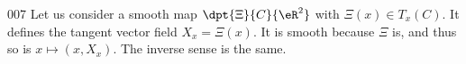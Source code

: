 \begin{corrige}{007}
Let us consider a smooth map $\dpt{ \Xi }{ C }{ \eR^2 }$ with $\Xi(x)\in T_x(C)$. It defines the tangent vector field $X_x=\Xi(x)$. It is smooth because $\Xi$ is, and thus so is $x\mapsto(x,X_x)$. The inverse sense is the same.

\end{corrige}

